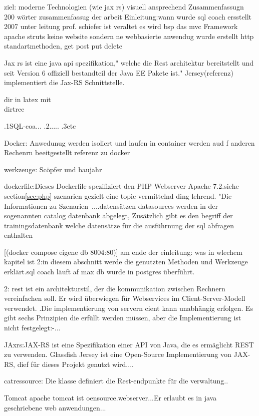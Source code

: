 \documentclass[fleqn,10pt,ngerman]{SelfArx}
\begin{document}
ziel: moderne Technologien (wie jax rs)
visuell ansprechend
Zusammenfassugn 200 wörter zusammenfassug der arbeit
Einleitung:wann wurde sql coach ersstellt 2007 unter leitung prof. schiefer
ist veraltet es wird bsp das  mvc Framework apache struts
	keine website sondern ne webbasierte anwendug wurde erstellt
	http standartmethoden, get post put delete
	
	Jax rs ist eine java api spezifikation," welche die Rest architektur bereitstellt und seit Version 6 offiziell bestandteil der Java EE Pakete ist."
	Jersey(referenz) implementiert die Jax-RS Schnittstelle.
	
	dir in latex mit \\dirtree{%
		
		.1SQL-coa...
		.2.....
		.3etc
	}
	Docker: Anwedunug werden isoliert und laufen in container
	werden aud f anderen Rechenrn beeitgestellt
	referenz zu docker
	
	werkzeuge:	Scöpfer und baujahr 
	
	dockerfile:Dieses Dockerfile spezifiziert den  PHP Webserver Apache 7.2.siehe section\ref{sec:php}
	szenarien gezielt eine topic vermittelnd ding lehrend.
	"Die Informationen zu Szenarien--....datensätzen datasources werden in der sogenannten catalog datenbank abgelegt, Zusätzlich gibt es den begriff der trainingsdatenbank welche  datensätze für die ausführnung der sql abfragen enthalten
	
	{[(docker compose eigene db 8004:80)]}
	    am ende der einleitung: was in wlechem kapitel ist
	    2:in diesem abschnitt werde die genutzten Methoden und Werkzeuge erklärt.sql coach läuft af max db wurde in postgres überführt. 
	    
	    2:
rest ist ein architekturstil, der die kommunikation zwischen Rechnern vereinfachen soll.
Er wird überwiegen für Webservices im Client-Server-Modell verwendet.
.Die implementierung von servern cient kann unabhängig erfolgen. Es gibt sechs Prinzipien die erfüllt werden müssen, aber die Implementierung ist nicht festgelegt:-...



JAxrs:JAX-RS ist eine Spezifikation einer API von Java, die es ermäglicht REST zu verwenden. Glassfish Jersey ist eine Open-Source Implementierung von JAX-RS, dief für dieses Projekt genutzt wird....

catressource: Die klasse definiert die Rest-endpunkte für die verwaltung..


Tomcat apache tomcat ist oensource.webserver...Er erlaubt es in java geschriebene web anwendungen...
\end{document}
